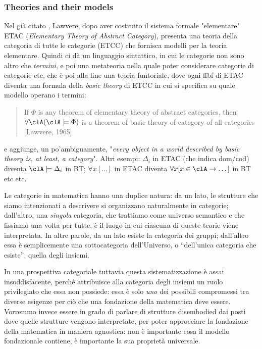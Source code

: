 \subsubsection{Theories and their models}
Nel già citato \cite{}, Lawvere, dopo aver costruito il sistema formale "elementare" ETAC (\emph{Elementary Theory of Abstract Category}), presenta una teoria della categoria di tutte le categorie (ETCC) che fornisca modelli per la teoria elementare. Quindi ci dà un linguaggio sintattico, in cui le categorie non sono altro che \emph{termini}, e poi una metateoria nella quale poter considerare categorie di categorie etc, che è poi alla fine una teoria funtoriale, dove ogni ffbf di ETAC diventa una formula della \emph{basic theory} di ETCC in cui si specifica su quale modello operano i termini:
\begin{quote}
	If $\Phi$ is any theorem of elementary theory of abstract categories, then $ \forall \clA (\clA \models \Phi)$ is a theorem of basic theory of category of all categories [Lawvere, 1965]
\end{quote}
e aggiunge, un po'ambiguamente, "\textit{every object in a world described by basic theory is, at least, a category}". Altri esempi: $\Delta_i$ in ETAC (che indica dom/cod) diventa $\clA \models \Delta_i$ in BT; $\forall x [\dots]$ in ETAC diventa $\forall x [x \in \clA \rightarrow \dots]$ in BT etc etc.

Le categorie in matematica hanno una duplice natura: da un lato, le strutture che siamo intenzionati a descrivere si organizzano naturalmente in categorie; dall'altro, una \emph{singola} categoria, che trattiamo come universo semantico e che fissiamo una volta per tutte, è il luogo in cui ciascuna di queste teorie viene interpretata. In altre parole, da un lato esiste la categoria dei gruppi; dall'altro essa è semplicemente una sottocategoria dell'Universo, o ``dell'unica categoria che esiste'': quella degli insiemi.

In una prospettiva categoriale tuttavia questa sistematizzazione è assai insoddisfacente, perché attribuisce alla categoria degli insiemi un ruolo privilegiato che essa non possiede: essa è solo \emph{uno} dei possibili compromessi tra diverse esigenze per ciò che una fondazione della matematica deve essere. Vorremmo invece essere in grado di parlare di strutture disembodied dai posti dove quelle strutture vengono interpretate, per poter approcciare la fondazione della matematica in maniera agnostica: non è importante cosa il modello fondazionale contiene, è importante la sua proprietà universale.


